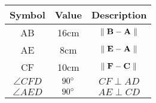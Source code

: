 \begin{tabular}{|c|c|c|}
\hline
Symbol & Value & Description\\
\hline
AB & 16cm & $\|\hspace{0.1cm} \vec{B} - \vec{A} \hspace{0.1cm}\|$ \\
\hline
AE & 8cm & $\|\hspace{0.1cm} \vec{E} - \vec{A} \hspace{0.1cm}\|$ \\
\hline
CF & 10cm & $\|\hspace{0.1cm} \vec{F} - \vec{C} \hspace{0.1cm}\|$ \\
\hline
$\angle{CFD}$ & $90\degree$ & $CF \perp AD$ \\
\hline
$\angle{AED}$ & $90\degree$ & $AE \perp CD$ \\
\hline
\end{tabular}
